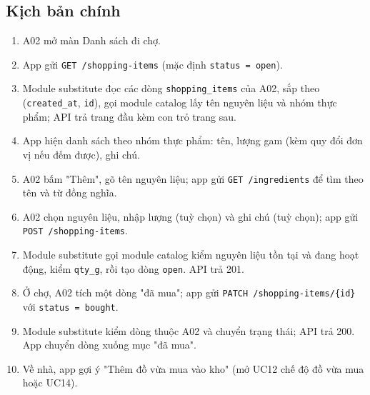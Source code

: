 \subsection{Kịch bản chính}
\begin{enumerate}
\item A02 mở màn Danh sách đi chợ.
\item App gửi {\small\texttt{GET /\allowbreak{}\allowbreak{}shopping-\allowbreak{}items}} (mặc định {\small\texttt{status = open}}).
\item Module substitute đọc các dòng {\small\texttt{shopping\_\allowbreak{}\allowbreak{}items}} của A02, sắp theo ({\small\texttt{created\_\allowbreak{}\allowbreak{}at}}, {\small\texttt{id}}), gọi module catalog lấy tên nguyên liệu và nhóm thực phẩm; API trả trang đầu kèm con trỏ trang sau.
\item App hiện danh sách theo nhóm thực phẩm: tên, lượng gam (kèm quy đổi đơn vị nếu đếm được), ghi chú.
\item A02 bấm "Thêm", gõ tên nguyên liệu; app gửi {\small\texttt{GET /\allowbreak{}\allowbreak{}ingredients}} để tìm theo tên và từ đồng nghĩa.
\item A02 chọn nguyên liệu, nhập lượng (tuỳ chọn) và ghi chú (tuỳ chọn); app gửi {\small\texttt{POST /\allowbreak{}\allowbreak{}shopping-\allowbreak{}items}}.
\item Module substitute gọi module catalog kiểm nguyên liệu tồn tại và đang hoạt động, kiểm {\small\texttt{qty\_\allowbreak{}\allowbreak{}g}}, rồi tạo dòng {\small\texttt{open}}. API trả 201.
\item Ở chợ, A02 tích một dòng "đã mua"; app gửi {\small\texttt{PATCH /\allowbreak{}\allowbreak{}shopping-\allowbreak{}items/\allowbreak{}\allowbreak{}\{id\}}} với {\small\texttt{status = bought}}.
\item Module substitute kiểm dòng thuộc A02 và chuyển trạng thái; API trả 200. App chuyển dòng xuống mục "đã mua".
\item Về nhà, app gợi ý "Thêm đồ vừa mua vào kho" (mở UC12 chế độ đồ vừa mua hoặc UC14).
\end{enumerate}
